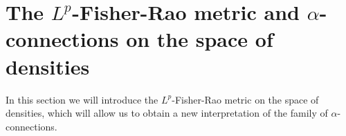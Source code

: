 \documentclass[11pt]{amsart}
\theoremstyle{definition}
\newcommand{\Prob}{\operatorname{Prob}(M)}
\newcommand{\Dens}{\operatorname{Dens}_+(M)}
\newcommand{\Diff}{\operatorname{Diff}(M)}
\begin{document}




\section{The $L^p$-Fisher-Rao metric and $\alpha$-connections on the space of densities}\label{sec:dens}
In this section we will introduce the $L^p$-Fisher-Rao metric on the space of densities, which will allow us to obtain a new interpretation of the family of $\alpha$-connections.

\end{document}
